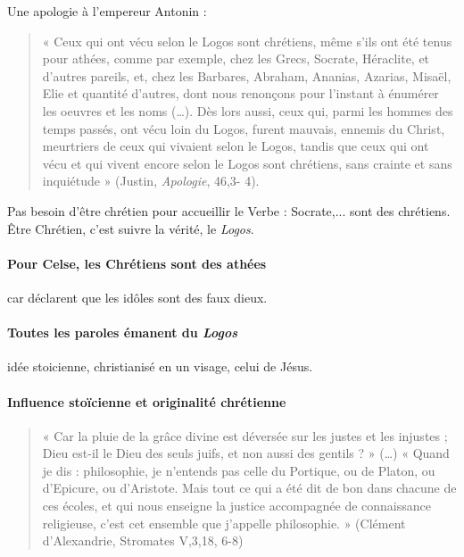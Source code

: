 Une apologie à l'empereur Antonin : 
\begin{quote}
    « Ceux qui ont vécu selon le Logos sont chrétiens, même s’ils ont été tenus pour athées,
comme par exemple, chez les Grecs, Socrate, Héraclite, et d’autres pareils, et, chez les
Barbares, Abraham, Ananias, Azarias, Misaël, Elie et quantité d’autres, dont nous renonçons
pour l’instant à énumérer les oeuvres et les noms (…). Dès lors aussi, ceux qui, parmi les
hommes des temps passés, ont vécu loin du Logos, furent mauvais, ennemis du Christ,
meurtriers de ceux qui vivaient selon le Logos, tandis que ceux qui ont vécu et qui vivent encore selon le Logos sont chrétiens, sans crainte et sans inquiétude » (Justin, \textit{Apologie}, 46,3-
4).
\end{quote}
\begin{Prop}
Pas besoin d'être chrétien pour accueillir le Verbe : Socrate,... sont des chrétiens.
Être Chrétien, c'est suivre la vérité, le \textit{Logos}.
\end{Prop}

\paragraph{Pour Celse, les Chrétiens sont des athées} car déclarent que les idôles sont des faux dieux. 


\paragraph{Toutes les paroles émanent du \textit{Logos}} idée stoicienne, christianisé en un visage, celui de Jésus. 

\paragraph{Influence stoïcienne et originalité chrétienne} 





\begin{quote}
    « Car la pluie de la grâce divine est déversée sur les justes et les injustes ; Dieu est-il le Dieu
des seuls juifs, et non aussi des gentils ? » (…) « Quand je dis : philosophie, je n’entends pas
celle du Portique, ou de Platon, ou d’Epicure, ou d’Aristote. Mais tout ce qui a été dit de bon
dans chacune de ces écoles, et qui nous enseigne la justice accompagnée de connaissance
religieuse, c’est cet ensemble que j’appelle philosophie. » (Clément d’Alexandrie, Stromates
V,3,18, 6-8)
\end{quote}


